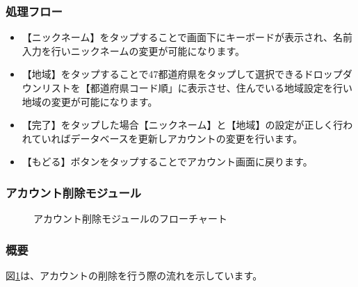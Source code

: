 \documentclass[a4j]{jarticle}
\begin{document}
\subsubsection*{処理フロー}
\begin{itemize}
\item 【ニックネーム】をタップすることで画面下にキーボードが表示され、名前入力を行いニックネームの変更が可能になります。
\item 【地域】をタップすることで47都道府県をタップして選択できるドロップダウンリストを【都道府県コード順」に表示させ、住んでいる地域設定を行い地域の変更が可能になります。
\item 【完了】をタップした場合【ニックネーム】と【地域】の設定が正しく行われていればデータベースを更新しアカウントの変更を行います。
\item 【もどる】ボタンをタップすることでアカウント画面に戻ります。
\end{itemize}

\subsubsection{アカウント削除モジュール\label{アカウント削除}} %
\begin{figure}[H]
    \begin{center}
    \caption {アカウント削除モジュールのフローチャート}
    \label{設定_アカウント削除}
    \end{center}
\end{figure}
\subsubsection*{概要}
	図\ref{設定_アカウント削除}は、アカウントの削除を行う際の流れを示しています。
\end{document}
